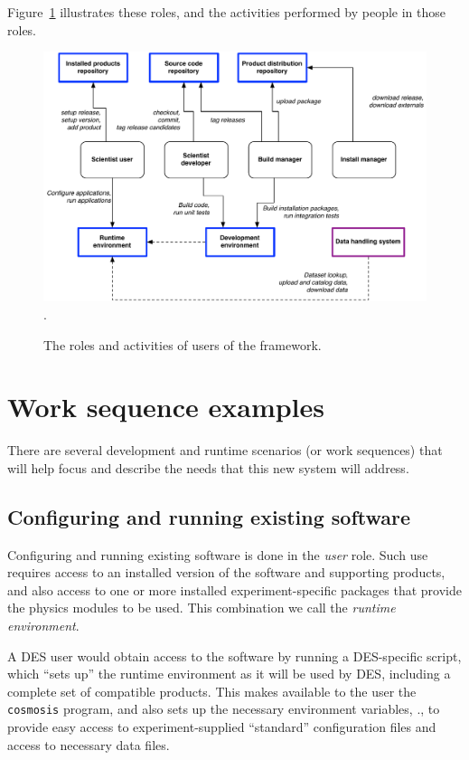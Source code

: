 \documentclass[draftmode,draftwater]{memarticle}
\newcommand{\prog}[1]%
  {\texttt{#1}}
\newcommand{\cosmosis}{\name{CosmoSIS}\xspace}
\begin{document}
Figure~\ref{fig:roles} illustrates these roles, and the activities
performed by people in those roles.
\begin{figure}
  \centering
  \includegraphics[width=\textwidth]{roles}.
  \caption{The roles and activities of users of the \cosmosis
    framework.}
  \label{fig:roles}
\end{figure}



\section{Work sequence examples}

There are several development and runtime scenarios (or work sequences)
that will help focus and describe the needs that this new system will
address.

\subsection{Configuring and running existing software}

Configuring and running existing software is done in the \emph{user}
role. Such use requires access to an installed version of the \cosmosis
software and supporting products, and also access to one or more
installed experiment-specific packages that provide the physics modules
to be used. This combination we call the \emph{runtime environment}.

A DES user would obtain access to the software by running a
DES-specific script, which ``sets up'' the runtime environment as
it will be used by DES, including a complete set of compatible products.
This makes available to the user the \prog{cosmosis} program, and also
sets up the necessary environment variables, \etc., to provide easy
access to experiment-supplied ``standard'' configuration files and
access to necessary data files.
\end{document}
